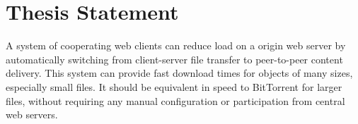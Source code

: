 

\section {Thesis Statement}\label{section:thesis}
A system of cooperating web clients can reduce load on a origin web server by automatically switching from client-server file transfer to peer-to-peer content delivery.  This system can provide fast download times for objects of many sizes, especially small files.  It should be equivalent in speed to BitTorrent for larger files, without requiring any manual configuration or participation from central web servers.

